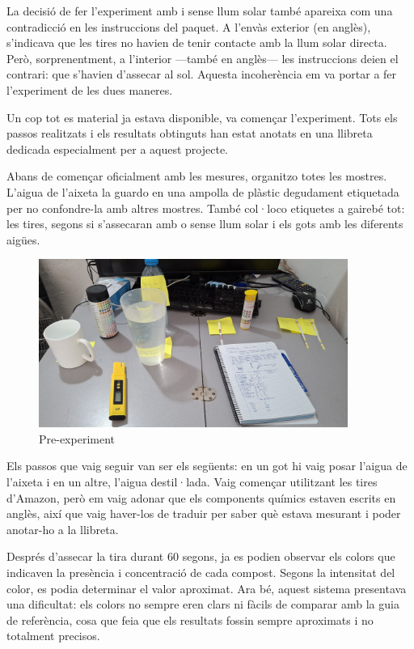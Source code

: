 La decisió de fer l'experiment amb i sense llum solar també apareixa com una contradicció en les instruccions del paquet. A l’envàs exterior (en anglès), s’indicava que les tires no havien de tenir contacte amb la llum solar directa. Però, sorprenentment, a l’interior —també en anglès— les instruccions deien el contrari: que s’havien d’assecar al sol. Aquesta incoherència em va portar a fer l’experiment de les dues maneres.


Un cop tot es material ja estava disponible, va començar l'experiment. Tots els passos realitzats i els resultats obtinguts han estat anotats en una llibreta dedicada especialment per a aquest projecte.

Abans de començar oficialment amb les mesures, organitzo totes les mostres. L’aigua de l’aixeta la guardo en una ampolla de plàstic degudament etiquetada per no confondre-la amb altres mostres. També col·loco etiquetes a gairebé tot: les tires, segons si s’assecaran amb o sense llum solar i els gots amb les diferents aigües.

\begin{figure}[H]
\centering
\includegraphics[width=0.9\textwidth, angle=0]{./Figures/expe.png}
\caption{Pre-experiment }
\label{fig:fotoPreExperiment}

\end{figure}

Els passos que vaig seguir van ser els següents: en un got hi vaig posar l’aigua de l’aixeta i en un altre, l’aigua destil·lada. Vaig començar utilitzant les tires d’Amazon, però em vaig adonar que els components químics estaven escrits en anglès, així que vaig haver-los de traduir per saber què estava mesurant i poder anotar-ho a la llibreta.

Després d’assecar la tira durant 60 segons, ja es podien observar els colors que indicaven la presència i concentració de cada compost. Segons la intensitat del color, es podia determinar el valor aproximat. Ara bé, aquest sistema presentava una dificultat: els colors no sempre eren clars ni fàcils de comparar amb la guia de referència, cosa que feia que els resultats fossin sempre aproximats i no totalment precisos.

